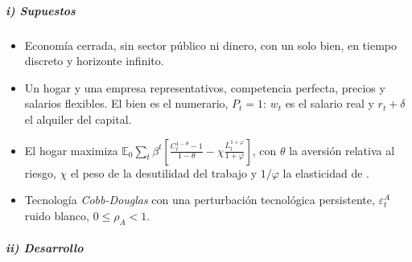 \documentclass[11pt]{article}
\begin{document}
\subparagraph{i) Supuestos}

\begin{itemize}
\item Economía cerrada, sin sector público ni dinero, con un solo bien, en tiempo discreto y horizonte infinito.
\item Un hogar y una empresa representativos, competencia perfecta, precios y salarios flexibles. El bien es el numerario, $P_t=1$: $w_t$ es el salario real y $r_t+\delta$ el alquiler del capital.
\item El hogar maximiza $\mathbb{E}_0\sum_t\beta^t\left[\frac{C_t^{1-\theta}-1}{1-\theta}-\chi\frac{L_t^{1+\varphi}}{1+\varphi}\right]$, con $\theta$ la aversión relativa al riesgo, $\chi$ el peso de la desutilidad del trabajo y $1/\varphi$ la elasticidad de .
\item Tecnología \emph{Cobb-Douglas} con una perturbación tecnológica persistente, $\varepsilon^A_t$ ruido blanco, $0\le\rho_A<1$.
\end{itemize}

\subparagraph{ii) Desarrollo}
\end{document}
